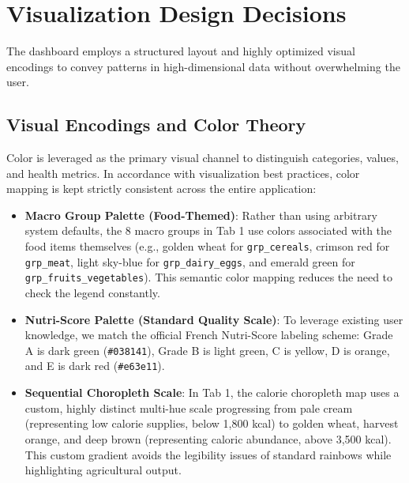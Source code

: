 \documentclass[10pt, a4paper]{article}
\begin{document}
\section{Visualization Design Decisions}
\label{sec:viz}

The dashboard employs a structured layout and highly optimized visual encodings to convey patterns in high-dimensional data without overwhelming the user.

\subsection{Visual Encodings and Color Theory}
Color is leveraged as the primary visual channel to distinguish categories, values, and health metrics. In accordance with visualization best practices, color mapping is kept strictly consistent across the entire application:
\begin{itemize}[nosep, leftmargin=1.5em]
    \item \textbf{Macro Group Palette (Food-Themed)}: Rather than using arbitrary system defaults, the 8 macro groups in Tab 1 use colors associated with the food items themselves (e.g., golden wheat for \texttt{grp\_cereals}, crimson red for \texttt{grp\_meat}, light sky-blue for \texttt{grp\_dairy\_eggs}, and emerald green for \texttt{grp\_fruits\_vegetables}). This semantic color mapping reduces the need to check the legend constantly.
    \item \textbf{Nutri-Score Palette (Standard Quality Scale)}: To leverage existing user knowledge, we match the official French Nutri-Score labeling scheme: Grade A is dark green (\texttt{\#038141}), Grade B is light green, C is yellow, D is orange, and E is dark red (\texttt{\#e63e11}).
    \item \textbf{Sequential Choropleth Scale}: In Tab 1, the calorie choropleth map uses a custom, highly distinct multi-hue scale progressing from pale cream (representing low calorie supplies, below 1,800 kcal) to golden wheat, harvest orange, and deep brown (representing caloric abundance, above 3,500 kcal). This custom gradient avoids the legibility issues of standard rainbows while highlighting agricultural output.
\end{itemize}
\end{document}
